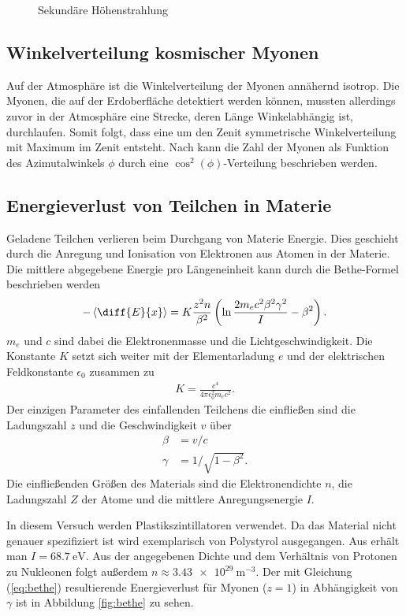 \begin{figure}[h]
\begin{subfigure}[h]{0.5\textwidth}
  \label{fig:fluss}
  \end{subfigure}
  \caption{Sekundäre Höhenstrahlung}
\end{figure}

\subsection{Winkelverteilung kosmischer Myonen}
Auf der Atmosphäre ist die Winkelverteilung der Myonen annähernd isotrop. Die Myonen, die auf der Erdoberfläche detektiert werden können, mussten allerdings zuvor in der Atmosphäre eine Strecke, deren Länge Winkelabhängig ist, durchlaufen. Somit folgt, dass eine um den Zenit symmetrische Winkelverteilung mit Maximum im Zenit entsteht. Nach \cite{winkelverteilung} kann die Zahl der Myonen als Funktion des Azimutalwinkels $\phi$ durch eine $\cos^2(\phi)$-Verteilung beschrieben werden.

\subsection{Energieverlust von Teilchen in Materie}
Geladene Teilchen verlieren beim Durchgang von Materie Energie. Dies geschieht durch die Anregung und Ionisation von Elektronen aus Atomen in der Materie. Die mittlere abgegebene Energie pro Längeneinheit kann durch die Bethe-Formel beschrieben werden\cite{sigmund2014particle}
\begin{align}
  -\left\langle \diff{E}{x} \right\rangle=K\frac{z^2n}{\beta^2}\left(\ln \frac{2m_ec^2\beta^2\gamma^2}{I} -\beta^2 \right).
  \label{eq:bethe}
\end{align}
$m_e$ und $c$ sind dabei die Elektronenmasse und die Lichtgeschwindigkeit. Die Konstante $K$ setzt sich weiter mit der Elementarladung $e$ und der elektrischen Feldkonstante $\epsilon_0$ zusammen zu
\begin{align*}
  K=\frac{e^4}{4\pi \epsilon_0^2m_ec^2}.
\end{align*}
Der einzigen Parameter des einfallenden Teilchens die einfließen sind die Ladungszahl $z$ und die Geschwindigkeit $v$ über
\begin{align*}
  \beta&=v/c\\
  \gamma&=1/\sqrt{1-\beta^2}.
\end{align*}
Die einfließenden Größen des Materials sind die Elektronendichte $n$, die Ladungszahl $Z$ der Atome und die mittlere Anregungsenergie $I$.

In diesem Versuch werden Plastikszintillatoren verwendet. Da das Material nicht genauer spezifiziert ist wird exemplarisch von Polystyrol ausgegangen. Aus \cite{polystyrene} erhält man $I=\SI{68.7}{\electronvolt}$. Aus der angegebenen Dichte und dem Verhältnis von Protonen zu Nukleonen folgt außerdem $n\approx \SI{3.43e29}{\metre^{-3}}$. Der mit Gleichung (\ref{eq:bethe}) resultierende Energieverlust für Myonen ($z=1$) in Abhängigkeit von $\gamma$ ist in Abbildung \ref{fig:bethe} zu sehen.

